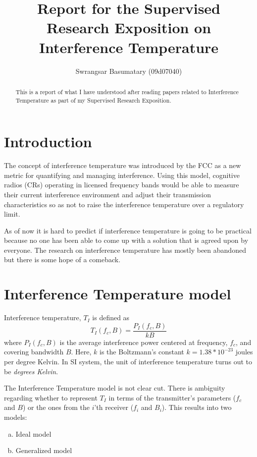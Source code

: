 \documentclass[12pt]{article}
\begin{document}
\title{Report for the Supervised Research Exposition on Interference Temperature}
\author{Swrangsar Basumatary (09d07040)}

\maketitle

\begin{abstract}
This is a report of what I have understood after reading papers related to Interference Temperature as part of my Supervised Research Exposition.
\end{abstract}

\section{Introduction}
The concept of interference temperature was introduced by the FCC as a new metric for quantifying and managing interference. Using this model, cognitive radios (CRs) operating in licensed frequency bands would be able to measure their current interference environment and adjust their transmission characteristics so as not to raise the interference temperature over a regulatory limit.

As of now it is hard to predict if interference temperature is going to be practical because no one has been able to come up with a solution that is agreed upon by everyone. The research on interference temperature has mostly been abandoned but there is some hope of a comeback.

\section{Interference Temperature model}
Interference temperature, $T_I$ is defined as
\begin{equation*} 
    T_I(f_c , B) = \frac{P_I(f_c , B)}{kB}
\end{equation*}
where $P_I(f_c,B)$ is the average interference power centered at frequency, $f_c$, and covering bandwidth
$B$. Here, $k$ is the Boltzmann's constant $k = 1.38 * 10^{-23} $ joules per degree Kelvin. In SI system, the unit of interference temperature turns out to be \emph{degrees Kelvin}.

The Interference Temperature model is not clear cut. There is ambiguity regarding whether to represent $T_I$ in terms of the transmitter's parameters ($f_c$ and $B$) or the ones from the $i$'th receiver ($f_i$ and $B_i$).
This results into two models:
\begin{enumerate}[a)]
    \item Ideal model
    \item Generalized model
\end{enumerate}
\end{document}
